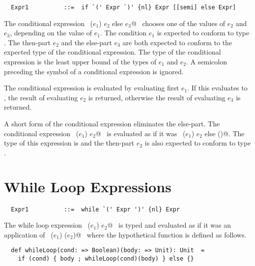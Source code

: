 \syntax\begin{lstlisting}
  Expr1          ::=  if `(' Expr `)' {nl} Expr [[semi] else Expr]
\end{lstlisting}

The conditional expression ~\lstinline@if ($e_1$) $e_2$ else $e_3$@~ chooses
one of the values of $e_2$ and $e_3$, depending on the
value of $e_1$. The condition $e_1$ is expected to
conform to type .  The then-part $e_2$ and the
else-part $e_3$ are both expected to conform to the expected
type of the conditional expression. The type of the conditional
expression is the least upper bound of the types of $e_1$ and
$e_2$.  A semicolon preceding the  symbol of a
conditional expression is ignored.

The conditional expression is evaluated by evaluating first
$e_1$. If this evaluates to , the result of
evaluating $e_2$ is returned, otherwise the result of
evaluating $e_3$ is returned.

A short form of the conditional expression eliminates the
else-part. The conditional expression ~\lstinline@if ($e_1$) $e_2$@~ is
evaluated as if it was ~\lstinline@if ($e_1$) $e_2$ else ()@.  The type of
this expression is  and the then-part
$e_2$ is also expected to conform to type .

\section{While Loop Expressions}\label{sec:while}

\syntax\begin{lstlisting}
  Expr1          ::=  while `(' Expr ')' {nl} Expr
\end{lstlisting}

The while loop expression ~\lstinline@while ($e_1$) $e_2$@~ is typed and
evaluated as if it was an application of ~\lstinline@whileLoop ($e_1$) ($e_2$)@~ where
the hypothetical function  is defined as follows.

\begin{lstlisting}
  def whileLoop(cond: => Boolean)(body: => Unit): Unit  =
    if (cond) { body ; whileLoop(cond)(body) } else {}
\end{lstlisting}


